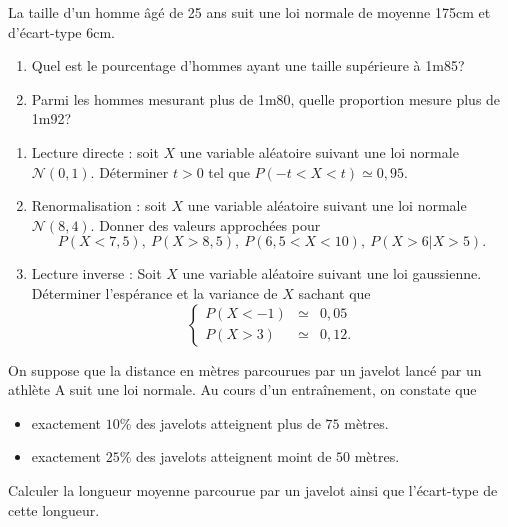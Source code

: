 \documentclass[../PolyS4.tex]{subfiles}
\begin{document}



La taille d'un homme âgé de 25 ans suit une loi normale de moyenne 175cm et d'écart-type 6cm.
\begin{enumerate}
 \item Quel est le pourcentage d'hommes ayant une taille supérieure à 1m85?
\item Parmi les hommes mesurant plus de 1m80, quelle proportion mesure plus de 1m92?
\end{enumerate}


\newpage


\begin{enumerate}
\item Lecture directe : soit $X$ une variable aléatoire suivant une loi normale $\mathcal N(0,1)$. 
Déterminer $t>0$ tel que $P(-t<X<t)\simeq 0,95$.
\item Renormalisation : soit $X$ une variable aléatoire suivant une loi normale $\mathcal N(8,4)$.
Donner des valeurs approchées pour 
$$P(X<7,5),\ P(X>8,5),\ P(6,5<X<10),\ P(X>6|X>5).$$
\item Lecture inverse : Soit $X$ une variable aléatoire suivant une loi gaussienne. Déterminer
l'espérance et la variance de $X$ sachant que 
$$\left\{
\begin{array}{rcl}
P(X<-1)&\simeq& 0,05\\
P(X>3)&\simeq& 0,12.
\end{array}\right.$$
\end{enumerate}






On suppose que la distance en mètres parcourues par un javelot lancé par un athlète A suit une loi normale. Au cours d'un entraînement, on constate que
\begin{itemize}
\item exactement $10\%$ des javelots atteignent plus de $75$ mètres.
\item exactement $25\%$ des javelots atteignent moint de $50$ mètres.
\end{itemize}
Calculer la longueur moyenne parcourue par un javelot ainsi que l'écart-type de cette longueur.\\
\end{document}

